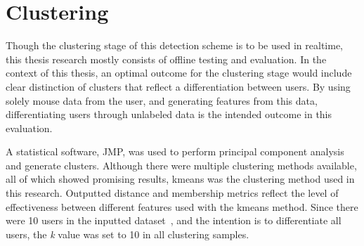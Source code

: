 
\section{Clustering}\label{sec:evaluation-clustering}
Though the clustering stage of this detection scheme is to be used in realtime, this thesis research mostly consists of offline testing and evaluation. In the context of this thesis, an optimal outcome for the clustering stage would include clear distinction of clusters that reflect a differentiation between users. By using solely mouse data from the user, and generating features from this data, differentiating users through unlabeled data is the intended outcome in this evaluation.

A statistical software, JMP, was used to perform principal component analysis and generate clusters. Although there were multiple clustering methods available, all of which showed promising results, kmeans was the clustering method used in this research. Outputted distance and membership metrics reflect the level of effectiveness between different features used with the kmeans method. Since there were 10 users in the inputted dataset~\cite{balabit_dataset}, and the intention is to differentiate all users, the \textit{k} value was set to 10 in all clustering samples.

